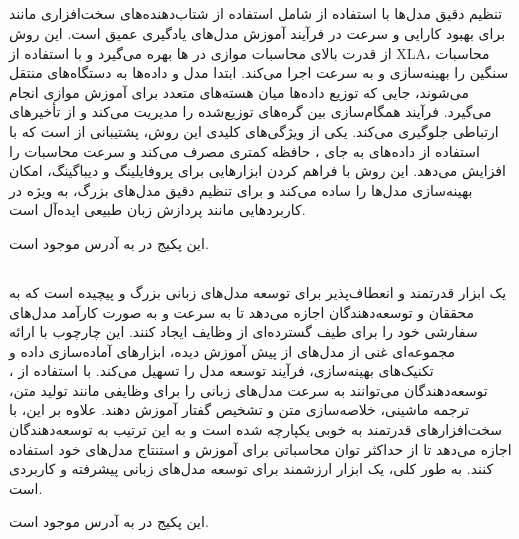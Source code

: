 \documentclass[11pt, a4paper, oneside]{book}
\begin{document}
			\subsection{}
				
				تنظیم دقیق مدل‌ها با استفاده از  شامل استفاده از شتاب‌دهنده‌های سخت‌افزاری مانند  برای بهبود کارایی و سرعت در فرآیند آموزش مدل‌های یادگیری عمیق است. این روش از قدرت بالای محاسبات موازی در ها بهره می‌گیرد و با استفاده از XLA، محاسبات سنگین را بهینه‌سازی و به سرعت اجرا می‌کند. ابتدا مدل و داده‌ها به دستگاه‌های  منتقل می‌شوند، جایی که توزیع داده‌ها میان هسته‌های متعدد  برای آموزش موازی انجام می‌گیرد. فرآیند همگام‌سازی بین گره‌های توزیع‌شده را مدیریت می‌کند و از تأخیرهای ارتباطی جلوگیری می‌کند. یکی از ویژگی‌های کلیدی این روش، پشتیبانی از  است که با استفاده از داده‌های  به جای ، حافظه کمتری مصرف می‌کند و سرعت محاسبات را افزایش می‌دهد. این روش با فراهم کردن ابزارهایی برای پروفایلینگ و دیباگینگ، امکان بهینه‌سازی مدل‌ها را ساده می‌کند و برای تنظیم دقیق مدل‌های بزرگ، به ویژه در کاربردهایی مانند پردازش زبان طبیعی ایده‌آل است.
				
				این پکیج در  به آدرس  موجود است.
			
			\subsection{}
			
				یک ابزار قدرتمند و انعطاف‌پذیر برای توسعه مدل‌های زبانی بزرگ و پیچیده است که به محققان و توسعه‌دهندگان اجازه می‌دهد تا به سرعت و به صورت کارآمد مدل‌های سفارشی خود را برای طیف گسترده‌ای از وظایف ایجاد کنند. این چارچوب با ارائه مجموعه‌ای غنی از مدل‌های از پیش آموزش دیده، ابزارهای آماده‌سازی داده و تکنیک‌های بهینه‌سازی، فرآیند توسعه مدل را تسهیل می‌کند. با استفاده از ، توسعه‌دهندگان می‌توانند به سرعت مدل‌های زبانی را برای وظایفی مانند تولید متن، ترجمه ماشینی، خلاصه‌سازی متن و تشخیص گفتار آموزش دهند. علاوه بر این،  با سخت‌افزارهای قدرتمند  به خوبی یکپارچه شده است و به این ترتیب به توسعه‌دهندگان اجازه می‌دهد تا از حداکثر توان محاسباتی برای آموزش و استنتاج مدل‌های خود استفاده کنند. به طور کلی،  یک ابزار ارزشمند برای توسعه مدل‌های زبانی پیشرفته و کاربردی است.
				
				این پکیج در  به آدرس  موجود است.
				
\end{document}
